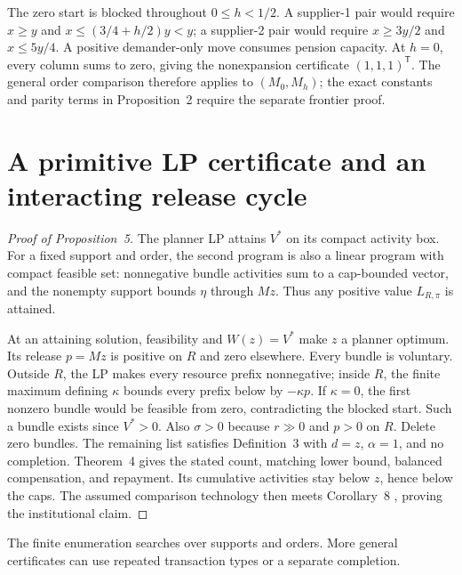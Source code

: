 \documentclass[ecta,draft,supplement]{econsocart}
\theoremstyle{definition}
\theoremstyle{definition}
\begin{document}
\begin{appendix}
The zero start is blocked throughout $0\leq h<1/2$. A supplier-1 pair would
require $x\geq y$ and $x\leq(3/4+h/2)y<y$; a supplier-2 pair would require
$x\geq3y/2$ and $x\leq5y/4$. A positive demander-only move consumes pension
capacity. At $h=0$, every column sums to zero, giving the nonexpansion
certificate $(1,1,1)^{\mathsf T}$. The general order comparison therefore
applies to $(M_0,M_h)$; the exact constants and parity terms in
Proposition~2%
 require the separate frontier proof.

\section{A primitive LP certificate and an interacting release cycle}
\label{app:primitiveproductivity}

\begin{proof}[Proof of Proposition~5%
]
The planner LP attains $V^*$ on its compact activity box. For a
fixed support and order, the second program is also a linear program
with compact feasible set: nonnegative bundle activities sum to a
cap-bounded vector, and the nonempty support bounds $\eta$ through
$Mz$. Thus any positive value $L_{R,\pi}$ is attained.

At an attaining solution, feasibility and $W(z)=V^*$ make $z$ a
planner optimum. Its release $p=Mz$ is positive on $R$ and zero
elsewhere. Every bundle is voluntary. Outside $R$, the LP makes
every resource prefix nonnegative; inside $R$, the finite maximum
defining $\kappa$ bounds every prefix below by $-\kappa p$.
If $\kappa=0$, the first nonzero bundle would be feasible from
zero, contradicting the blocked start. Such a bundle exists since
$V^*>0$. Also $\sigma>0$ because $r\gg0$ and $p>0$ on $R$.
Delete zero bundles. The remaining list satisfies
Definition~3%
 with $d=z$, $\alpha=1$,
and no completion. Theorem~4%
 gives the
stated count, matching lower bound, balanced compensation, and
repayment. Its cumulative activities stay below $z$, hence below
the caps. The assumed comparison technology then meets
Corollary~8%
, proving the institutional claim.
\end{proof}

The finite enumeration searches over supports and orders. More general
certificates can use repeated transaction types or a separate completion.


\end{appendix}
\end{document}
